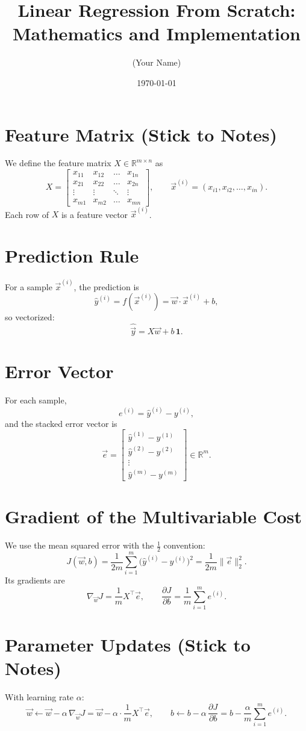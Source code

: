 \documentclass[12pt]{article}
\title{Linear Regression From Scratch: Mathematics and Implementation}
\author{(Your Name)}
\date{\today}
\begin{document}
\maketitle

\section{Feature Matrix (Stick to Notes)}
We define the feature matrix $X\in\mathbb{R}^{m\times n}$ as
\[
X=
\begin{bmatrix}
x_{11} & x_{12} & \dots & x_{1n}\\
x_{21} & x_{22} & \dots & x_{2n}\\
\vdots & \vdots & \ddots & \vdots\\
x_{m1} & x_{m2} & \dots & x_{mn}
\end{bmatrix},
\qquad
\vec x^{(i)}=(x_{i1},x_{i2},\dots,x_{in}).
\]
Each row of $X$ is a feature vector $\vec x^{(i)}$.

\section{Prediction Rule}
For a sample $\vec x^{(i)}$, the prediction is
\[
\hat y^{(i)}=f(\vec x^{(i)})=\vec w\cdot\vec x^{(i)}+b,
\]
so vectorized:
\[
\hat{\vec y}=X\vec w + b\,\mathbf 1.
\]

\section{Error Vector}
For each sample,
\[
e^{(i)}=\hat y^{(i)}-y^{(i)},
\]
and the stacked error vector is
\[
\vec e=
\begin{bmatrix}
\hat y^{(1)}-y^{(1)}\\
\hat y^{(2)}-y^{(2)}\\
\vdots\\
\hat y^{(m)}-y^{(m)}
\end{bmatrix}
\in\mathbb{R}^m.
\]

\section{Gradient of the Multivariable Cost}
We use the mean squared error with the $\tfrac12$ convention:
\[
J(\vec w,b)=\frac{1}{2m}\sum_{i=1}^m\!\big(\hat y^{(i)}-y^{(i)}\big)^2
=\frac{1}{2m}\|\vec e\|_2^2.
\]
Its gradients are
\[
\nabla_{\vec w}J=\frac{1}{m}X^\top\vec e,
\qquad
\frac{\partial J}{\partial b}=\frac{1}{m}\sum_{i=1}^m e^{(i)}.
\]

\section{Parameter Updates (Stick to Notes)}
With learning rate $\alpha$:
\[
\vec w \leftarrow \vec w - \alpha\,\nabla_{\vec w}J
=\vec w-\alpha\cdot\frac{1}{m}X^\top\vec e,
\qquad
b \leftarrow b - \alpha\,\frac{\partial J}{\partial b}
=b-\frac{\alpha}{m}\sum_{i=1}^m e^{(i)}.
\]
\end{document}
